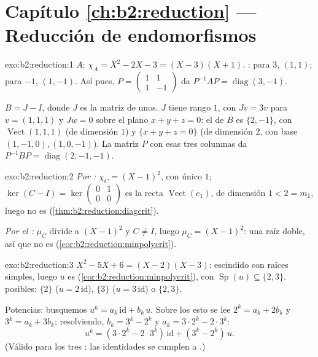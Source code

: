 \section*{Capítulo \ref{ch:b2:reduction} --- Reducción de endomorfismos}

\begin{solution}{exo:b2:reduction:1}
$A$: $\chi_A = X^2 - 2X - 3 = (X - 3)(X + 1)$. :
para $3$, $(1,1)$; para $-1$, $(1,-1)$. Así pues, $P =
\begin{pmatrix} 1 & 1\\ 1 & -1\end{pmatrix}$ da $P^{-1}AP =
\operatorname{diag}(3, -1)$.

$B = J - I$, donde $J$ es la matriz de unos. $J$ tiene rango $1$, con
$Jv = 3v$ para $v = (1,1,1)$ y $Jw = 0$ sobre el plano $x + y + z =
0$: el  de $B$ es $\{2, -1\}$, con 
$\operatorname{Vect}(1,1,1)$ (de dimensión $1$) y $\{x + y + z = 0\}$
(de dimensión $2$, con base $(1,-1,0), (1,0,-1)$). La matriz $P$ con
esas tres columnas da $P^{-1}BP = \operatorname{diag}(2, -1, -1)$.
\end{solution}

\begin{solution}{exo:b2:reduction:2}
\emph{Por :} $\chi_C = (X-1)^2$, con único
 $1$; $\ker(C - I) = \ker\begin{pmatrix} 0&1\\
0&0\end{pmatrix}$ es la recta $\operatorname{Vect}(e_1)$, de
dimensión $1 < 2 = m_1$, luego no es 
(\cref{thm:b2:reduction:diagcrit}).

\emph{Por el :} $\mu_C$ divide a $(X-1)^2$ y $C
\neq I$, luego $\mu_C = (X-1)^2$: una raíz doble, así que no es
 (\cref{cor:b2:reduction:minpolycrit}).
\end{solution}

\begin{solution}{exo:b2:reduction:3}
$X^2 - 5X + 6 = (X-2)(X-3)$: escindido con raíces simples, luego $u$
es  (\cref{cor:b2:reduction:minpolycrit}), con
$\operatorname{Sp}(u) \subseteq \{2, 3\}$.  posibles:
$\{2\}$ ($u = 2\,\mathrm{id}$), $\{3\}$ ($u = 3\,\mathrm{id}$) o
$\{2, 3\}$.

Potencias: busquemos $u^k = a_k\,\mathrm{id} + b_k\,u$. Sobre los
 esto se lee $2^k = a_k + 2b_k$ y $3^k = a_k +
3b_k$; resolviendo, $b_k = 3^k - 2^k$ y $a_k = 3\cdot2^k - 2\cdot
3^k$:
\[
u^k = (3\cdot 2^k - 2\cdot 3^k)\,\mathrm{id} + (3^k - 2^k)\, u .
\]
(Válido para los tres : las identidades se cumplen  a .)
\end{solution}


